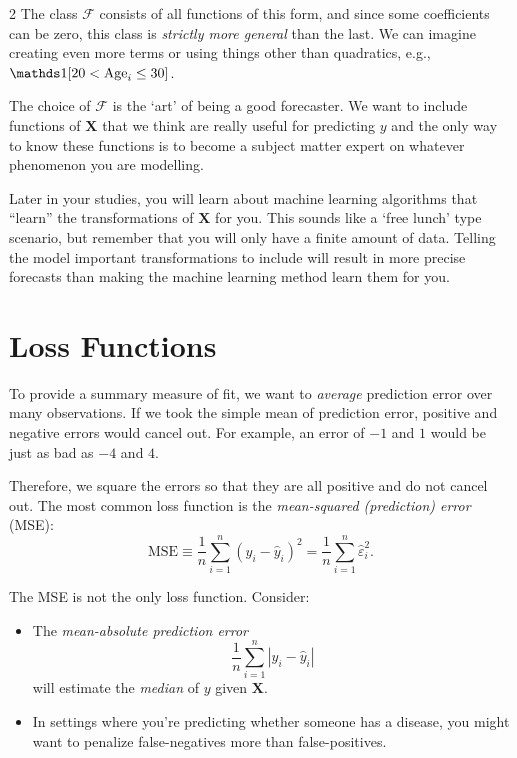 \documentclass[12pt]{article}
\begin{document}
\begin{multicols}{2}
  The class $\mathcal{F}$ consists of all functions of this form, and since some coefficients can be zero, this class is \emph{strictly more general} than the last. We can imagine creating even more terms or using things other than quadratics, e.g., $\one{20 < \text{Age}_i \leq 30}$.

  The choice of $\mathcal{F}$ is the `art' of being a good forecaster.
  We want to include functions of $\bm{X}$ that we think are really useful for predicting $y$ and the only way to know these functions is to become a subject matter expert on whatever phenomenon you are modelling.

  Later in your studies, you will learn about machine learning algorithms that ``learn'' the transformations of $\bm{X}$ for you.
  This sounds like a `free lunch' type scenario, but remember that you will only have a finite amount of data.
  Telling the model important transformations to include will result in more precise forecasts than making the machine learning method learn them for you.


  \section*{Loss Functions}

  To provide a summary measure of fit, we want to \emph{average} prediction error over many observations.
  If we took the simple mean of prediction error, positive and negative errors would cancel out.
  For example, an error of $-1$ and $1$ would be just as bad as $-4$ and $4$.

  \bigskip
  Therefore, we square the errors so that they are all positive and do not cancel out.
  The most common loss function is the \emph{mean-squared (prediction) error} (MSE):
  $$
  \text{MSE} \equiv \frac{1}{n} \sum_{i=1}^n \left( y_i - \hat{y}_i \right)^2 = \frac{1}{n} \sum_{i=1}^n \hat{\varepsilon}_i^2.
  $$

  The MSE is not the only loss function. Consider:
  \begin{itemize}
    \item The \emph{mean-absolute prediction error} $$\frac{1}{n} \sum_{i=1}^n \left| y_i - \hat{y}_i \right|$$ will estimate the \emph{median} of $y$ given $\bm{X}$.
    \item In settings where you're predicting whether someone has a disease, you might want to penalize false-negatives more than false-positives.
  \end{itemize}


\end{multicols}
\end{document}
